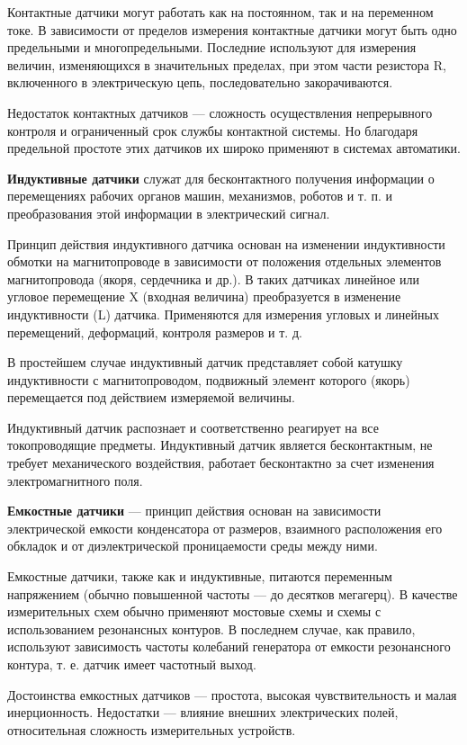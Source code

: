 Контактные датчики могут работать как на постоянном, так и на переменном токе. В зависимости от пределов измерения контактные датчики могут быть одно предельными и многопредельными. Последние используют для измерения величин, изменяющихся в значительных пределах, при этом части резистора R, включенного в электрическую цепь, последовательно закорачиваются. 

Недостаток контактных датчиков --- сложность осуществления непрерывного контроля и ограниченный срок службы контактной системы. Но благодаря предельной простоте этих датчиков их широко применяют в системах автоматики.

\textbf{Индуктивные датчики} служат для бесконтактного получения информации о перемещениях рабочих органов машин, механизмов, роботов и т. п. и преобразования этой информации в электрический сигнал.

Принцип действия индуктивного датчика основан на изменении индуктивности обмотки на магнитопроводе в зависимости от положения отдельных элементов магнитопровода (якоря, сердечника и др.). В таких датчиках линейное или угловое перемещение X (входная величина) преобразуется в изменение индуктивности (L) датчика. Применяются для измерения угловых и линейных перемещений, деформаций, контроля размеров и т. д.

В простейшем случае индуктивный датчик представляет собой катушку индуктивности с магнитопроводом, подвижный элемент которого (якорь) перемещается под действием измеряемой величины.

Индуктивный датчик распознает и соответственно реагирует на все токопроводящие предметы. Индуктивный датчик является бесконтактным, не требует механического воздействия, работает бесконтактно за счет изменения электромагнитного поля.


\textbf{Емкостные датчики} --- принцип действия основан на зависимости электрической емкости конденсатора от размеров, взаимного расположения его обкладок и от диэлектрической проницаемости среды между ними.

Емкостные датчики, также как и индуктивные, питаются переменным напряжением (обычно повышенной частоты --- до десятков мегагерц). В качестве измерительных схем обычно применяют мостовые схемы и схемы с использованием резонансных контуров. В последнем случае, как правило, используют зависимость частоты колебаний генератора от емкости резонансного контура, т. е. датчик имеет частотный выход.

Достоинства емкостных датчиков --- простота, высокая чувствительность и малая инерционность. Недостатки --- влияние внешних электрических полей, относительная сложность измерительных устройств.

